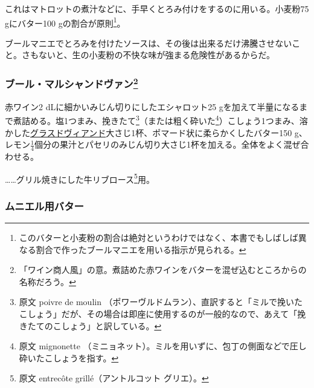 \begin{recette}
これはマトロットの煮汁などに、手早くとろみ付けをするのに用いる。小麦粉75
gにバター100 gの割合が原則\footnote{このバターと小麦粉の割合は絶対というわけではなく、本書でもしばしば異なる割合で作ったブールマニエを用いる指示が見られる。}。

ブールマニエでとろみを付けたソースは、その後は出来るだけ沸騰させないこと。さもないと、生の小麦粉の不快な味が強まる危険性があるからだ。

\hypertarget{beurre-marchand-de-vin}{%
\subsubsection[ブール・マルシャンドヴァン]{\texorpdfstring{ブール・マルシャンドヴァン\footnote{「ワイン商人風」の意。煮詰めた赤ワインをバターを混ぜ込むところからの名称だろう。}}{ブール・マルシャンドヴァン}}\label{beurre-marchand-de-vin}}



赤ワイン2 dLに細かいみじん切りにしたエシャロット25
gを加えて半量になるまで煮詰める。塩1つまみ、挽きたて\footnote{原文
  poivre de moulin
  （ポワーヴルドムラン）、直訳すると「ミルで挽いたこしょう」だが、その場合は即座に使用するのが一般的なので、あえて「挽きたてのこしょう」と訳している。}（または粗く砕いた\footnote{原文
  mignonette
  （ミニョネット）。ミルを用いずに、包丁の側面などで圧し砕いたこしょうを指す。}）こしょう1つまみ、溶かした\protect\hyperlink{glace-de-viande}{グラスドヴィアンド}大さじ1杯、ポマード状に柔らかくしたバター150
g、レモン\(\frac{1}{4}\)個分の果汁とパセリのみじん切り大さじ1杯を加える。全体をよく混ぜ合わせる。

\ldots{}\ldots{}グリル焼きにした牛リブロース\footnote{原文 entrecôte
  grillé（アントルコット グリエ）。}用。

\hypertarget{beurre-a-la-meuniere}{%
\subsubsection{ムニエル用バター}\label{beurre-a-la-meuniere}}


\end{recette}
